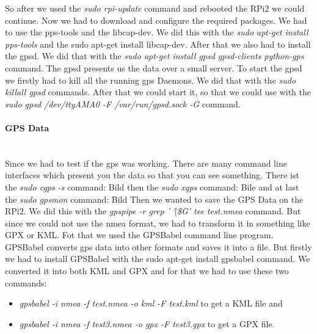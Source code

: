 So after we used the \textit{sudo rpi-update} command and rebooted the RPi2 we could continue.\newline
 Now we had to download and configure the required packages. We had to use the pps-tools and the libcap-dev. We did this with the \textit{sudo apt-get install pps-tools} and the sudo apt-get install libcap-dev. After that we also had to install the gpsd. We did that with the \textit{sudo apt-get install gpsd gpsd-clients python-gps} command. The gpsd presents us the data over a small server.\newline
To start the gpsd we firstly had to kill all the running gps Daemons. We did that with the \textit{sudo killall gpsd} commands. After that we could start it, so that we could use with the \textit{sudo gpsd /dev/ttyAMA0 -F /var/run/gpsd.sock -G} command.

\paragraph{GPS Data} \mbox{}\\
Since we had to test if the gps was working. There are many command line interfaces which present you the data so that you can see something.\newline
There ist the \textit{sudo cgps -s} command:\newline
Bild
\newline
then the \textit{sudo xgps} command:\newline
Bile
\newline
and at last the \textit{sudo gpsmon} command:\newline
Bild
\newline
Then we wanted to save the GPS Data on the RPi2. We did this with the \textit{gpspipe -r \text{\textbar} grep ' \^\textbackslash \$G' \text{\textbar} tee test.nmea} command.
But since we could not use the nmea format, we had to transform it in something like GPX or KML. Fot that we used the GPSBabel command line program. GPSBabel converts gps data into other formats and saves it into a file. But firstly we had to install GPSBabel with the sudo apt-get install gpsbabel command. We converted it into both KML and GPX and for that we had to use these two commands: 
\begin{itemize}
\item \textit{gpsbabel -i nmea -f test.nmea -o kml -F test.kml} to get a KML file and
\item \textit{gpsbabel -i nmea -f test3.nmea -o gpx -F test3.gpx} to get a GPX file.
\end{itemize}

